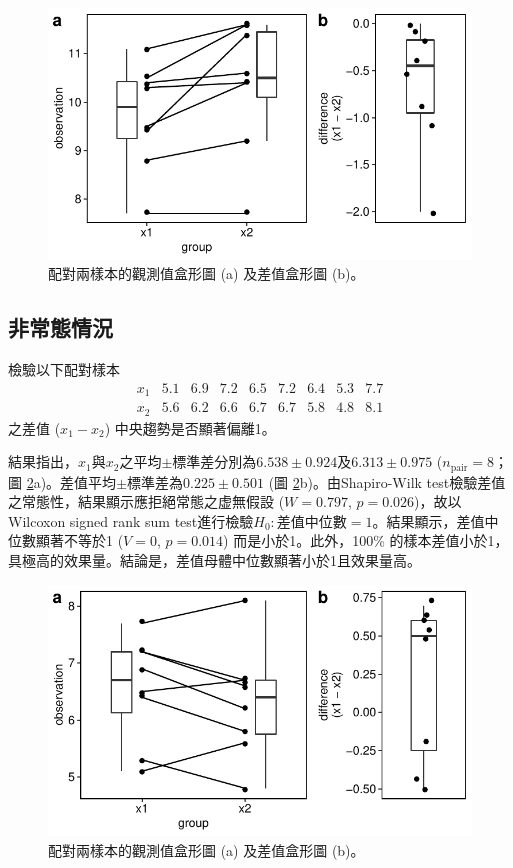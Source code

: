 \documentclass[12pt]{article}
\begin{document}
\begin{figure}[htb!]
	\centering
	\includegraphics[]{normal_paired_test.pdf}
	\caption{配對兩樣本的觀測值盒形圖 (a) 及差值盒形圖 (b)。}
	\label{fig:normal_paired_test}
\end{figure}

\subsection{非常態情況}
檢驗以下配對樣本
\[
\begin{matrix}
x_1 & 5.1 & 6.9 & 7.2 & 6.5 & 7.2 & 6.4 & 5.3 & 7.7 \\
x_2 & 5.6 & 6.2 & 6.6 & 6.7 & 6.7 & 5.8 & 4.8 & 8.1
\end{matrix}
\]
之差值 ($x_1 - x_2$) 中央趨勢是否顯著偏離1。

結果指出，$x_1$與$x_2$之平均$\pm$標準差分別為$6.538 \pm 0.924$及$6.313 \pm 0.975$ ($n_\mathrm{pair} = 8$；圖 \ref{fig:non-normal_paired_test}a)。差值平均$\pm$標準差為$0.225\pm0.501$ (圖 \ref{fig:non-normal_paired_test}b)。由Shapiro-Wilk test檢驗差值之常態性，結果顯示應拒絕常態之虚無假設 ($W = 0.797$, $p = 0.026$)，故以Wilcoxon signed rank sum test進行檢驗$H_0: \text{差值中位數}=1$。結果顯示，差值中位數顯著不等於1 ($V = 0$, $p = 0.014$) 而是小於1。此外，100\% 的樣本差值小於1，具極高的效果量。結論是，差值母體中位數顯著小於1且效果量高。

\begin{figure}[htb!]
	\centering
	\includegraphics[]{non-normal_paired_test.pdf}
	\caption{配對兩樣本的觀測值盒形圖 (a) 及差值盒形圖 (b)。}
	\label{fig:non-normal_paired_test}
\end{figure}
\end{document}
